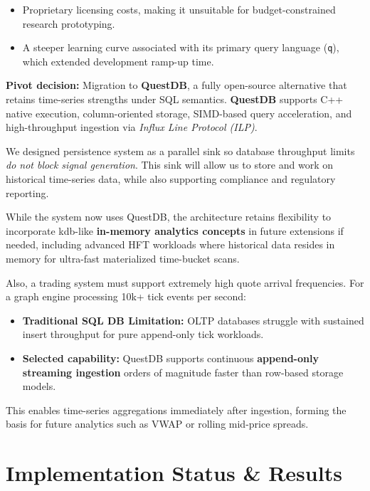 \documentclass[letterpaper,11pt]{report}
\begin{document}
\begin{itemize}
    \item Proprietary licensing costs, making it unsuitable for budget-constrained research prototyping.
    \item A steeper learning curve associated with its primary query language (\texttt{q}), which extended development ramp-up time.
\end{itemize}

\textbf{Pivot decision:} Migration to \textbf{QuestDB}, a fully open-source alternative that retains time-series strengths under SQL semantics. \textbf{QuestDB} supports C++ native execution, column-oriented storage, SIMD-based query acceleration, and high-throughput ingestion via \emph{Influx Line Protocol (ILP)}.

We designed persistence system as a parallel sink so database throughput limits \emph{do not block signal generation}. This sink will allow us to store and work on historical time-series data, while also supporting compliance and regulatory reporting.

While the system now uses QuestDB, the architecture retains flexibility to incorporate kdb-like \textbf{in-memory analytics concepts} in future extensions if needed, including advanced HFT workloads where historical data resides in memory for ultra-fast materialized time-bucket scans.


Also, a trading system must support extremely high quote arrival frequencies. For a graph engine processing 10k+ tick events per second:

\begin{itemize}
    \item \textbf{Traditional SQL DB Limitation:} OLTP databases struggle with sustained insert throughput for pure append-only tick workloads.
    \item \textbf{Selected capability:} QuestDB supports continuous \textbf{append-only streaming ingestion} orders of magnitude faster than row-based storage models.
\end{itemize}

This enables time-series aggregations immediately after ingestion, forming the basis for future analytics such as VWAP or rolling mid-price spreads.

\chapter{Implementation Status \& Results}
\end{document}
